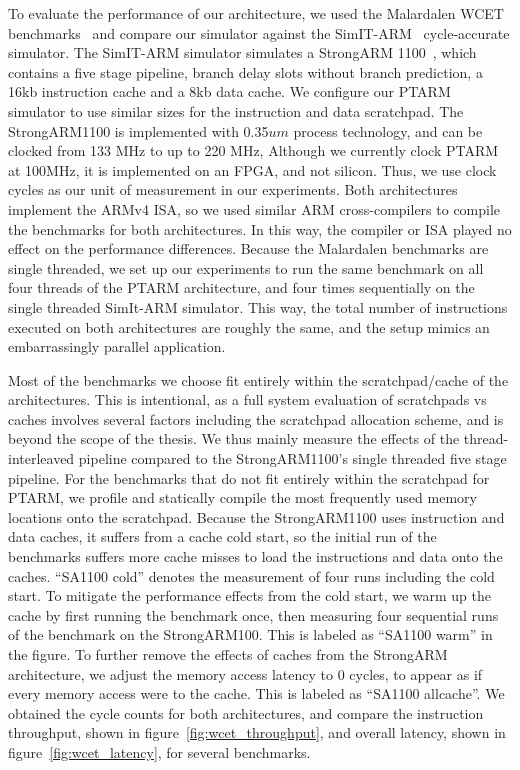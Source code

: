 To evaluate the performance of our architecture, we used the Malardalen WCET benchmarks~\cite{Gustafsson:WCET2010:Benchmarks} and compare our simulator against the SimIT-ARM~\cite{Qin:2003:FFM:789083.1022785} cycle-accurate simulator.
The SimIT-ARM simulator simulates a StrongARM 1100~\cite{intel-sa-1100}, which contains a five stage pipeline, branch delay slots without branch prediction, a 16kb instruction cache and a 8kb data cache.
We configure our PTARM simulator to use similar sizes for the instruction and data scratchpad.
The StrongARM1100 is implemented with 0.35$um$ process technology, and can be clocked from 133 MHz to up to 220 MHz, 
Although we currently clock PTARM at 100MHz, it is implemented on an FPGA, and not silicon. 
Thus, we use clock cycles as our unit of measurement in our experiments.     
Both architectures implement the ARMv4 ISA, so we used similar ARM cross-compilers to compile the benchmarks for both architectures.
In this way, the compiler or ISA played no effect on the performance differences.
Because the Malardalen benchmarks are single threaded, we set up our experiments to run the same benchmark on all four threads of the PTARM architecture, and four times sequentially on the single threaded SimIt-ARM simulator.
This way, the total number of instructions executed on both architectures are roughly the same, and the setup mimics an embarrassingly parallel application.   

Most of the benchmarks we choose fit entirely within the scratchpad/cache of the architectures.
This is intentional, as a full system evaluation of scratchpads vs caches involves several factors including the scratchpad allocation scheme, and is beyond the scope of the thesis.
We thus mainly measure the effects of the thread-interleaved pipeline compared to the StrongARM1100's single threaded five stage pipeline. 
For the benchmarks that do not fit entirely within the scratchpad for PTARM, we profile and statically compile the most frequently used memory locations onto the scratchpad.
Because the StrongARM1100 uses instruction and data caches, it suffers from a cache cold start, so the initial run of the benchmarks suffers more cache misses to load the instructions and data onto the caches. 
``SA1100 cold'' denotes the measurement of four runs including the cold start.  
To mitigate the performance effects from the cold start, we warm up the cache by first running the benchmark once, then measuring four sequential runs of the benchmark on the StrongARM100.  
This is labeled as ``SA1100 warm'' in the figure. 
To further remove the effects of caches from the StrongARM architecture, we adjust the memory access latency to 0 cycles, to appear as if every memory access were to the cache. 
This is labeled as ``SA1100 allcache''.
We obtained the cycle counts for both architectures, and compare the instruction throughput, shown in figure~\ref{fig:wcet_throughput}, and overall latency, shown in figure~\ref{fig:wcet_latency}, for several benchmarks.

